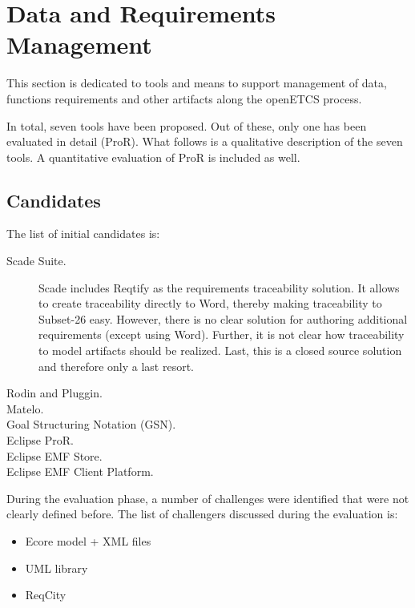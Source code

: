 

\chapter{Data and Requirements Management}
\label{sec:management}

 
This section is dedicated to tools and means to support management of data, functions requirements and other artifacts along  the openETCS process.

In total, seven tools have been proposed.  Out of these, only one has been evaluated in detail (ProR).  What follows is a qualitative description of the seven tools.  A quantitative evaluation of ProR is included as well.

\section{Candidates}
The list of initial candidates is:

\begin{description}
\item[Scade Suite.]  Scade includes Reqtify as the requirements traceability solution.  It allows to create traceability directly to Word, thereby making traceability to Subset-26 easy.  However, there is no clear solution for authoring additional requirements (except using Word).  Further, it is not clear how traceability to model artifacts should be realized.  Last, this is a closed source solution and therefore only a last resort.
\item[Rodin and Pluggin.]
\item[Matelo.]
\item[Goal Structuring Notation (GSN).]
\item[Eclipse ProR.]
\item[Eclipse EMF Store.]
\item[Eclipse EMF Client Platform.]
\end{description}


During the evaluation phase, a number of challenges were identified that were not clearly defined before.
The list of challengers discussed during the evaluation is:

\begin{itemize}
\item Ecore model + XML  files
\item UML library
\item ReqCity
\end{itemize}


